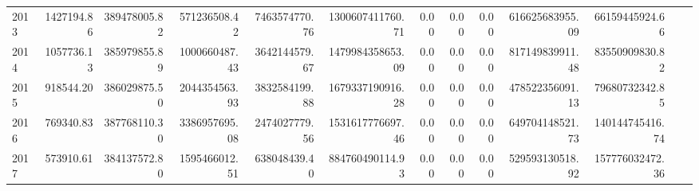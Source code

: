 \documentclass[11pt, a4paper]{article}
\begin{document}
\begin{landscape}
\begin{tabular}{lrrrrrrrrrrrr}
    2013 & 1427194.86 & 389478005.82 & 571236508.42 & 7463574770.76 & 1300607411760.71 & 0.00 & 0.00 & 0.00 & 616625683955.09 & 66159445924.66 \\
    2014 & 1057736.13 & 385979855.89 & 1000660487.43 & 3642144579.67 & 1479984358653.09 & 0.00 & 0.00 & 0.00 & 817149839911.48 & 83550909830.82 \\
    2015 & 918544.20 & 386029875.50 & 2044354563.93 & 3832584199.88 & 1679337190916.28 & 0.00 & 0.00 & 0.00 & 478522356091.13 & 79680732342.85 \\
    2016 & 769340.83 & 387768110.30 & 3386957695.08 & 2474027779.56 & 1531617776697.46 & 0.00 & 0.00 & 0.00 & 649704148521.73 & 140144745416.74 \\
    2017 & 573910.61 & 384137572.80 & 1595466012.51 & 638048439.40 & 884760490114.93 & 0.00 & 0.00 & 0.00 & 529593130518.92 & 157776032472.36 \\
     \hline
  \end{tabular}
\FloatBarrier
\end{landscape}
\newpage
\end{document}
